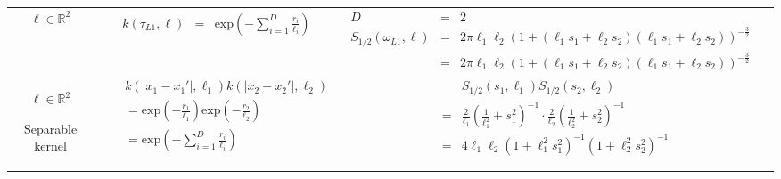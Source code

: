\documentclass[]{interact}
\theoremstyle{plain}%
\theoremstyle{definition}
\theoremstyle{remark}
\begin{document}
\begin{landscape}
\begin{table}[H]
\begin{center}
\begin{tabular}{|c|c|c|c|}
       \multicolumn{1}{|p{1.5cm}|}{
       \vspace{1mm}
       $\bm{\ell} \in \mathbb{R}^2$
       }
       
         & \multicolumn{1}{|p{5.7cm}|}{\small
         \begin{eqnarray*}
		k(\tau_{L1},\bm{\ell}) &=& \mathrm{exp}\left(- \sum_{i=1}^{D}\frac{r_i}{\ell_i} \right)
         \end{eqnarray*}
       }
       
       & \multicolumn{1}{|p{9.7cm}|}{\small
         \begin{eqnarray*}
         D &=& 2\\
		S_{1/2}(\omega_{L1},\bm{\ell}) &=& 2\pi\ell_1\ell_2 \left(1+(\ell_1 s_{1}+\ell_2 s_{2})(\ell_1 s_{1}+\ell_2 s_{2})\right)^{-\frac{3}{2}} \\
		&=& 2\pi\ell_1\ell_2 \left( 1+ (\ell_1 s_{1}+\ell_2 s_{2})(\ell_1 s_{1}+\ell_2 s_{2}) \right)^{-\frac{3}{2}}
         \end{eqnarray*}
       }
       
       & \multicolumn{1}{|p{5.7cm}|}{\small

       } \\  
       
       \cline{1-3}
       
       \multicolumn{1}{|p{1.5cm}|}{
       \vspace{1mm}
       $\bm{\ell} \in \mathbb{R}^2$
       
       {Separable kernel} 
       }
       
        & \multicolumn{1}{|p{5.7cm}|}{\small
         \begin{eqnarray*}
		&&k(|x_1-x_1'|,\ell_1)k(|x_2-x_2'|,\ell_2) \\
		&&= \mathrm{exp}\left(- \frac{r_1}{\ell_1} \right) \mathrm{exp}\left(- \frac{r_2}{\ell_2} \right) \\
		&&= \mathrm{exp}\left(- \sum_{i=1}^{D}\frac{r_i}{\ell_i} \right)
         \end{eqnarray*}
       }
       
       & \multicolumn{1}{|p{9.7cm}|}{\small
         \begin{eqnarray*}
         &&S_{1/2}(s_1,\ell_1)S_{1/2}(s_2,\ell_2) \\
		&=& \frac{2}{\ell_1}\left(\frac{1}{\ell_1^2}+s_1^2 \right)^{-1} \cdot \frac{2}{\ell_2}\left(\frac{1}{\ell_2^2}+s_2^2 \right)^{-1} \\
		&=& 4\ell_1\ell_2\left(1+\ell_1^2s_1^2 \right)^{-1} \left(1+\ell_2^2s_2^2 \right)^{-1} \\
         \end{eqnarray*}      
       } 


\end{tabular}
\end{center}
\end{table}
\end{landscape}
\end{document}
